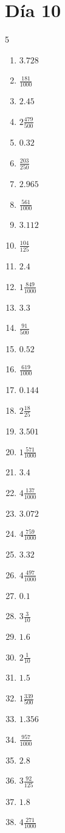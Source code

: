 \documentclass[12pt]{article}
\begin{document}
\section*{Día 10}
\begin{multicols}{5}\begin{enumerate}
\item $ 3.728 $
\item $ \frac{181}{1000} $
\item $ 2.45 $
\item $ 2 \frac{479}{500} $
\item $ 0.32 $
\item $ \frac{203}{250} $
\item $ 2.965 $
\item $ \frac{561}{1000} $
\item $ 3.112 $
\item $ \frac{104}{125} $
\item $ 2.4 $
\item $ 1 \frac{849}{1000} $
\item $ 3.3 $
\item $ \frac{91}{500} $
\item $ 0.52 $
\item $ \frac{619}{1000} $
\item $ 0.144 $
\item $ 2 \frac{18}{25} $
\item $ 3.501 $
\item $ 1 \frac{571}{1000} $
\item $ 3.4 $
\item $ 4 \frac{137}{1000} $
\item $ 3.072 $
\item $ 4 \frac{759}{1000} $
\item $ 3.32 $
\item $ 4 \frac{497}{1000} $
\item $ 0.1 $
\item $ 3 \frac{3}{10} $
\item $ 1.6 $
\item $ 2 \frac{1}{10} $
\item $ 1.5 $
\item $ 1 \frac{339}{500} $
\item $ 1.356 $
\item $ \frac{957}{1000} $
\item $ 2.8 $
\item $ 3 \frac{92}{125} $
\item $ 1.8 $
\item $ 4 \frac{271}{1000} $

\end{enumerate}
\end{multicols}
\end{document}
